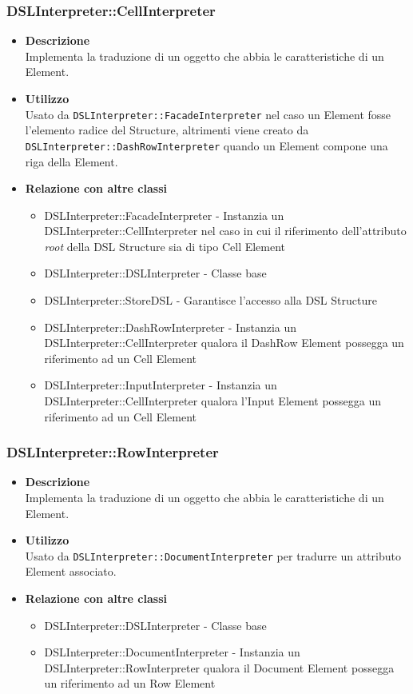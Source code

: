 \subsubsection{DSLInterpreter::CellInterpreter}
\begin{itemize}
\item \textbf{Descrizione} \hfill \\
Implementa la traduzione di un oggetto che abbia le caratteristiche di un  Element.
\item \textbf{Utilizzo} \hfill \\
Usato da \texttt{DSLInterpreter::FacadeInterpreter} nel caso un  Element fosse l'elemento radice del  Structure, altrimenti viene creato da \\\texttt{DSLInterpreter::DashRowInterpreter} quando un  Element compone una riga della  Element.
\item \textbf{Relazione con altre classi}
\begin{itemize}
\item DSLInterpreter::FacadeInterpreter - Instanzia un DSLInterpreter::CellInterpreter nel caso in cui il riferimento dell'attributo \textit{root} della DSL Structure sia di tipo Cell Element 
\item DSLInterpreter::DSLInterpreter - Classe base
\item DSLInterpreter::StoreDSL - Garantisce l'accesso alla DSL Structure
\item DSLInterpreter::DashRowInterpreter - Instanzia un DSLInterpreter::CellInterpreter qualora il DashRow Element possegga un riferimento ad un Cell Element
\item DSLInterpreter::InputInterpreter - Instanzia un DSLInterpreter::CellInterpreter qualora l'Input Element possegga un riferimento ad un Cell Element
\end{itemize}
\end{itemize}

\subsubsection{DSLInterpreter::RowInterpreter}
\begin{itemize}
\item \textbf{Descrizione} \hfill \\
Implementa la traduzione di un oggetto che abbia le caratteristiche di un  Element.
\item \textbf{Utilizzo} \hfill \\
Usato da \texttt{DSLInterpreter::DocumentInterpreter} per tradurre un attributo  Element associato.
\item \textbf{Relazione con altre classi}  
\begin{itemize}
\item DSLInterpreter::DSLInterpreter - Classe base
\item DSLInterpreter::DocumentInterpreter - Instanzia un DSLInterpreter::RowInterpreter qualora il Document Element possegga un riferimento ad un Row Element
\end{itemize}
\end{itemize}

